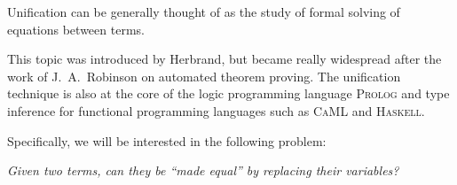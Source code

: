 Unification can be generally thought of as the study of formal solving of equations between terms.

This topic was introduced by Herbrand, but became really widespread after the work of J.~A.~Robinson on automated theorem proving.
The unification technique is also at the core of the logic programming language \textsc{Prolog} and type inference for functional programming languages such as \textsc{CaML} and \textsc{Haskell}.


Specifically, we will be interested in the following problem: 
\vspace{-1mm}
\begin{center}
	\it Given two terms, can they be \enquote{made equal} by replacing their variables?
\end{center}
\vspace{-2mm}



